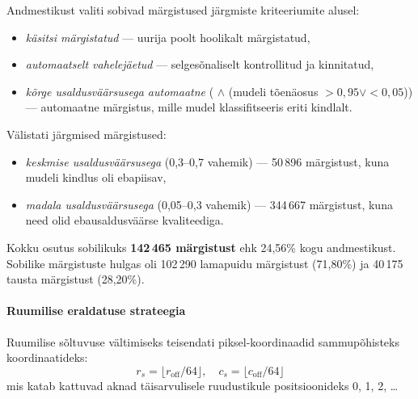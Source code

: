     Andmestikust valiti sobivad märgistused järgmiste kriteeriumite alusel:
    \begin{itemize}
        \item \textit{käsitsi märgistatud} --- uurija poolt hoolikalt märgistatud,
        \item \textit{automaatselt vahelejäetud} --- selgesõnaliselt kontrollitud ja kinnitatud,
        \item \textit{kõrge usaldusväärsusega automaatne} ( $\land$ (mudeli tõenäosus $>0{,}95 \lor <0{,}05$)) --- automaatne märgistus, mille mudel klassifitseeris eriti kindlalt.
    \end{itemize}

    Välistati järgmised märgistused:
    \begin{itemize}
        \item \textit{keskmise usaldusväärsusega} (0,3--0,7 vahemik) --- 50\,896 märgistust, kuna mudeli kindlus oli ebapiisav,
        \item \textit{madala usaldusväärsusega} (0,05--0,3 vahemik) --- 344\,667 märgistust, kuna need olid ebausaldusväärse kvaliteediga.
    \end{itemize}

    Kokku osutus sobilikuks \textbf{142\,465 märgistust} ehk 24,56\% kogu andmestikust. Sobilike märgistuste hulgas oli 102\,290 lamapuidu märgistust (71,80\%) ja 40\,175 tausta märgistust (28,20\%).

    \paragraph{Ruumilise eraldatuse strateegia}

    Ruumilise sõltuvuse vältimiseks teisendati piksel-koordinaadid sammupõhisteks koordinaatideks:
    \[
    r_s = \lfloor r_{\text{off}} / 64 \rfloor, \quad c_s = \lfloor c_{\text{off}} / 64 \rfloor
    \]
    mis katab kattuvad aknad täisarvulisele ruudustikule positsioonideks 0, 1, 2, \ldots


